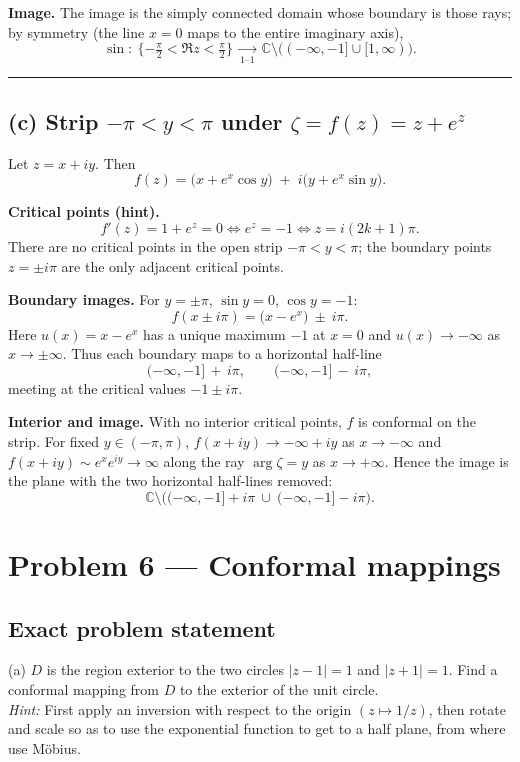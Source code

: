 \documentclass[11pt]{article}
\begin{document}
	\textbf{Image.} The image is the simply connected domain whose boundary is those rays; by symmetry (the line $x=0$ maps to the entire imaginary axis),
	\[
	\boxed{\ \sin:\ \{-\tfrac{\pi}{2}<\Re z<\tfrac{\pi}{2}\}\ \xrightarrow[\text{1--1}]{}
		\ \mathbb{C}\setminus\big((-\infty,-1]\cup[1,\infty)\big). \ }
	\]
	
	\bigskip\hrule\bigskip
	
	\subsection*{(c) Strip $-\pi<y<\pi$ under $\zeta=f(z)=z+e^{z}$}
	
	Let $z=x+iy$. Then
	\[
	f(z)=\big(x+e^{x}\cos y\big)\;+\;i\big(y+e^{x}\sin y\big).
	\]
	
	\textbf{Critical points (hint).}
	\[
	f'(z)=1+e^{z}=0 \iff e^{z}=-1 \iff z=i(2k+1)\pi .
	\]
	There are no critical points in the open strip $-\pi<y<\pi$; the boundary points $z=\pm i\pi$ are the only adjacent critical points.
	
	\textbf{Boundary images.}
	For $y=\pm\pi$, $\sin y=0$, $\cos y=-1$:
	\[
	f(x\pm i\pi)=\big(x-e^{x}\big)\ \pm\ i\pi.
	\]
	Here $u(x)=x-e^{x}$ has a unique maximum $-1$ at $x=0$ and $u(x)\to-\infty$ as $x\to\pm\infty$.
	Thus each boundary maps to a horizontal half-line
	\[
	(-\infty,-1]\,+\,i\pi,\qquad (-\infty,-1]\,-\,i\pi,
	\]
	meeting at the critical values $-1\pm i\pi$.
	
	\textbf{Interior and image.}
	With no interior critical points, $f$ is conformal on the strip.
	For fixed $y\in(-\pi,\pi)$, $f(x+iy)\to -\infty+iy$ as $x\to-\infty$ and
	$f(x+iy)\sim e^{x}e^{iy}\to\infty$ along the ray $\arg\zeta=y$ as $x\to+\infty$.
	Hence the image is the plane with the two horizontal half-lines removed:
	\[
	\boxed{\ \mathbb{C}\setminus\Big((-\infty,-1]+i\pi\ \cup\ (-\infty,-1]-i\pi\Big). \ }
	\]
	
	\section{Problem 6 — Conformal mappings}
	
	\subsection*{Exact problem statement}
	
	\noindent
	(a)\; $D$ is the region exterior to the two circles $|z-1|=1$ and $|z+1|=1$.
	Find a conformal mapping from $D$ to the exterior of the unit circle.\\
	\emph{Hint:} First apply an inversion with respect to the origin $(z\mapsto 1/z)$,
	then rotate and scale so as to use the exponential function to get to a half plane,
	from where use Möbius.
	
\end{document}
